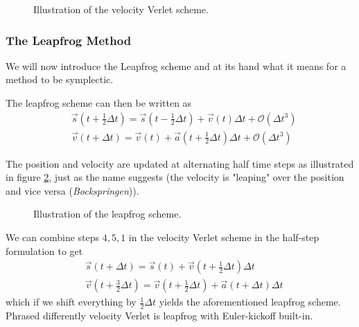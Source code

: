 \begin{figure}[!htb]
  \centering
  \hfill
  \caption{Illustration of the velocity Verlet scheme.}
  \label{fig:vel_verl}
\end{figure}

\subsubsection{The Leapfrog Method}
We will now introduce the Leapfrog scheme and at its hand what it means for a method to be symplectic.

The leapfrog scheme can then be written as
\begin{equation}
\begin{aligned}
& \vec{s}(t + \frac{1}{2} \Delta t)=\vec{s}(t - \frac{1}{2} \Delta t)+ \vec{v}(t) \Delta t + \mathcal{O}(\Delta t^3) \\
& \vec{v}(t + \Delta t)=\vec{v}(t)+ \vec{a}(t + \frac{1}{2} \Delta t) \Delta t  + \mathcal{O}(\Delta t^3)
\end{aligned}
\end{equation}

The position and velocity are updated at alternating half time steps as illustrated in figure \ref{fig:leapfrog},
just as the name suggests (the velocity is "leaping" over the position and vice versa (\textit{Bockspringen})).

\begin{figure}[!htb]
  \centering
  \hfill
  \caption{Illustration of the leapfrog scheme.}
  \label{fig:leapfrog}
\end{figure}


We can combine steps $4,5,1$ in the velocity Verlet scheme in the half-step formulation to get
\begin{equation}
  \begin{aligned}
    & \vec{s}(t + \Delta t) = \vec{s}(t) + \vec{v}\left( t + \frac{1}{2} \Delta t \right) \Delta t \\
    & \vec{v}(t + \frac{3}{2} \Delta t) =\vec{v}(t + \frac{1}{2} \Delta t) + \vec{a}(t + \Delta t) \Delta t
    \end{aligned}
\end{equation}
which if we shift everything by $\frac{1}{2} \Delta t$ yields the aforementioned leapfrog scheme. Phrased differently
velocity Verlet is leapfrog with Euler-kickoff built-in.

